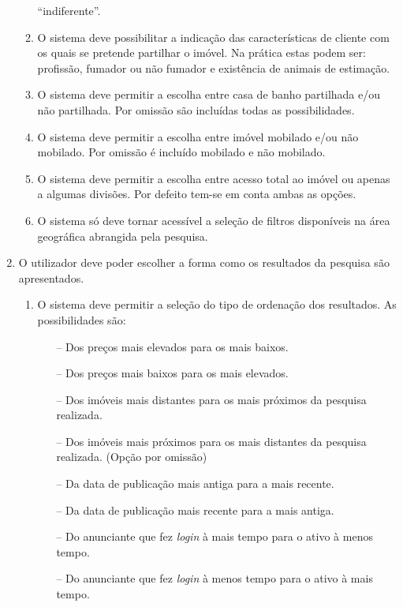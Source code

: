 \begin{enumerate}
\begin{enumerate}
        ``indiferente''.
        \item O sistema deve possibilitar a indicação das características de cliente com os quais se pretende partilhar o imóvel. Na prática estas podem ser: profissão, fumador ou não fumador e existência de animais de estimação.
        \item O sistema deve permitir a escolha entre casa de banho partilhada e/ou não partilhada. Por omissão são incluídas todas as possibilidades.
        \item O sistema deve permitir a escolha entre imóvel mobilado e/ou não mobilado. Por omissão é incluído mobilado e não mobilado.
        \item O sistema deve permitir a escolha entre
        acesso total ao imóvel ou apenas a algumas divisões. Por defeito tem-se em conta ambas as opções.
        \item O sistema só deve tornar acessível a seleção de filtros disponíveis na área geográfica abrangida pela pesquisa.
    \end{enumerate}
    \item O utilizador deve poder escolher a forma como os resultados da pesquisa são
    apresentados.
    \begin{enumerate}
        \item O sistema deve permitir a seleção do tipo de ordenação dos resultados. As possibilidades são:
        \begin{itemize}
            \item[--] Dos preços mais elevados para os mais baixos.
            \item[--] Dos preços mais baixos para os mais elevados. 
            \item[--] Dos imóveis mais distantes para os mais próximos da pesquisa
            realizada.
            \item[--] Dos imóveis mais próximos para os mais distantes da pesquisa
            realizada. (Opção por omissão)
            \item[--] Da data de publicação mais antiga para a mais recente.
            \item[--] Da data de publicação mais recente para a mais antiga.
            \item[--] Do anunciante que fez \textit{login} à mais tempo para o ativo à menos tempo.
            \item[--] Do anunciante que fez \textit{login} à menos tempo para o ativo à mais tempo.
        \end{itemize}
    \end{enumerate}
\end{enumerate}

